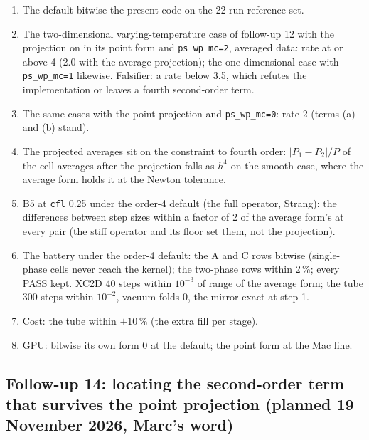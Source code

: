 \documentclass[11pt,a4paper]{article}
\newcommand{\code}[1]{\texttt{\small #1}}
\begin{document}
\begin{enumerate}[nosep]
\item The default bitwise the present code on the 22-run reference set.
\item The two-dimensional varying-temperature case of follow-up 12 with
      the projection on in its point form and \code{ps\_wp\_mc=2}, averaged
      data: rate at or above 4 (2.0 with the average projection); the
      one-dimensional case with \code{ps\_wp\_mc=1} likewise.  Falsifier:
      a rate below 3.5, which refutes the implementation or leaves a
      fourth second-order term.
\item The same cases with the point projection and \code{ps\_wp\_mc=0}:
      rate 2 (terms (a) and (b) stand).
\item The projected averages sit on the constraint to fourth order:
      $|P_1 - P_2|/P$ of the cell averages after the projection falls as
      $h^4$ on the smooth case, where the average form holds it at the
      Newton tolerance.
\item B5 at \code{cfl} 0.25 under the order-4 default (the full
      operator, Strang): the differences between step sizes within a
      factor of 2 of the average form's at every pair (the stiff operator
      and its floor set them, not the projection).
\item The battery under the order-4 default: the A and C rows bitwise
      (single-phase cells never reach the kernel); the two-phase rows
      within 2\,\%; every PASS kept.  XC2D 40 steps within $10^{-3}$ of
      range of the average form; the tube 300 steps within $10^{-2}$,
      vacuum folds 0, the mirror exact at step 1.
\item Cost: the tube within $+10\,\%$ (the extra fill per stage).
\item GPU: bitwise its own form 0 at the default; the point form at the
      Mac line.
\end{enumerate}

\subsection*{Follow-up 14: locating the second-order term that survives the point projection (planned 19 November 2026, Marc's word)}
\end{document}
